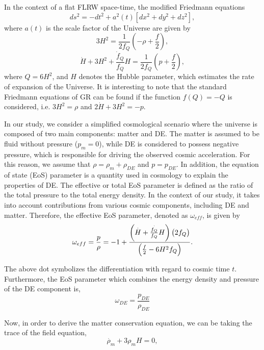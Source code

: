 \documentclass[prd,superscriptaddress,amsfonts,amssymb,amsmath,showpacs,twocolumn]{revtex4-2}
\begin{document}
In the context of a flat FLRW space-time, the modified Friedmann
equations 
\begin{equation}
ds^{2}=-dt^{2}+a^{2}(t)[dx^{2}+dy^{2}+dz^{2}],  \label{3a}
\end{equation}%
where $a(t)$ is the scale factor of the Universe are given by \cite{Q4}%
\begin{equation}
3H^{2}=\frac{1}{2f_{Q}}\left( -\rho +\frac{f}{2}\right) ,  \label{F1}
\end{equation}%
\begin{equation}
\dot{H}+3H^{2}+\frac{\dot{f}_{Q}}{f_{Q}}H=\frac{1}{2f_{Q}}\left( p+\frac{f}{2%
}\right) ,  \label{F2}
\end{equation}
where $Q=6H^{2}$, and $H$ denotes the Hubble parameter, which estimates the
rate of expansion of the Universe. It is interesting to note that the
standard Friedmann equations of GR can be found if the function $f(Q)=-Q$ is
considered, i.e. $3H^{2}=\rho $ and $2\dot{H}+3H^{2}=-p$.

In our study, we consider a simplified cosmological scenario where the universe is composed of two main components: matter and DE. The matter is assumed to be fluid without pressure ($p_{m}=0$), while DE is considered to possess negative pressure, which is responsible for driving the observed cosmic acceleration. For this reason, we assume that $\rho=\rho_{m}+\rho_{DE}$ and $p=p_{DE}$. In addition, the equation of state (EoS) parameter is a quantity used in cosmology to
explain the properties of DE. The effective or total EoS parameter is defined as the ratio of the total pressure to the total energy density. In the context of our study, it takes into account contributions from various cosmic components, including DE and matter. Therefore, the effective EoS parameter, denoted as $\omega_{eff}$, is given by
\begin{equation}
\omega_{eff} =\frac{p}{\rho }=-1+\frac{\left( \overset{.}{H}+\frac{\overset{.}{%
f_{Q}}}{f_{Q}}H\right) \left( 2f_{Q}\right) }{\left( \frac{f}{2}%
-6H^{2}f_{Q}\right) }.  \label{3l}
\end{equation}

The above dot symbolizes the differentiation with regard to cosmic time $t$. Furthermore, the EoS parameter which combines the energy density and pressure of the DE component is,
\begin{equation}
    \omega_{DE}=\frac{p_{DE}}{\rho_{DE}}
\end{equation}

Now, in order to derive the matter conservation equation, we can be taking the trace of the field equation,
\begin{equation}
\overset{.}{\rho }_{m}+3\rho _{m}H=0,  \label{cm}
\end{equation}
\end{document}
